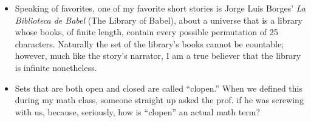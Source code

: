 \documentclass{article}
\begin{document}
\begin{itemize}[label=$\bullet$]
  \item Speaking of favorites, one of my favorite short stories is Jorge Luis Borges' \textit{La Biblioteca de Babel} (The Library of Babel), about a universe that is a library whose books, of finite length, contain every possible permutation of 25 characters. Naturally the set of the library's books cannot be countable; however, much like the story's narrator, I am a true believer that the library is infinite nonetheless.


  \item Sets that are both open and closed are called ``clopen.'' When we defined this during my math class, someone straight up asked the prof. if he was screwing with us, because, seriously, how is ``clopen'' an actual math term?
\end{itemize}

\clearpage
\printindex

\end{document}
